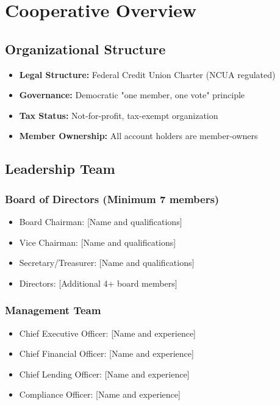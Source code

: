 \documentclass[11pt,letterpaper]{article}
\begin{document}
\section{Cooperative Overview}

\subsection{Organizational Structure}
\begin{itemize}[leftmargin=*]
    \item \textbf{Legal Structure:} Federal Credit Union Charter (NCUA regulated)
    \item \textbf{Governance:} Democratic "one member, one vote" principle
    \item \textbf{Tax Status:} Not-for-profit, tax-exempt organization
    \item \textbf{Member Ownership:} All account holders are member-owners
\end{itemize}

\subsection{Leadership Team}

\subsubsection{Board of Directors (Minimum 7 members)}
\begin{itemize}[leftmargin=*]
    \item Board Chairman: [Name and qualifications]
    \item Vice Chairman: [Name and qualifications]
    \item Secretary/Treasurer: [Name and qualifications]
    \item Directors: [Additional 4+ board members]
\end{itemize}

\subsubsection{Management Team}
\begin{itemize}[leftmargin=*]
    \item Chief Executive Officer: [Name and experience]
    \item Chief Financial Officer: [Name and experience]
    \item Chief Lending Officer: [Name and experience]
    \item Compliance Officer: [Name and experience]
\end{itemize}
\end{document}
